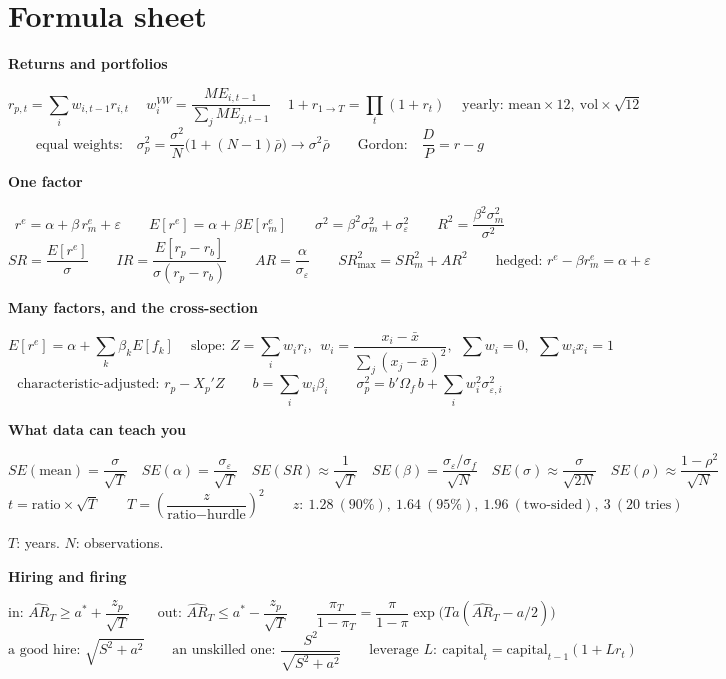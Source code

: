 \documentclass[11pt]{article}
\newcounter{ex}[section]
\newcommand{\head}[1]{\par\medskip\textbf{#1}\par}
\newcommand{\re}{r^{e}}
\newcommand{\SR}{\mathit{SR}}
\newcommand{\AR}{\mathit{AR}}
\newcommand{\IR}{\mathit{IR}}
\begin{document}
\section*{Formula sheet}\label{sec:sheet}
{\small
\head{Returns and portfolios}
\[ r_{p,t} = \sum_{i} w_{i,t-1}r_{i,t} \quad\ w^{VW}_{i} = \frac{ME_{i,t-1}}{\sum_{j}ME_{j,t-1}} \quad\
   1 + r_{1\to T} = \prod_{t}(1+r_{t}) \quad\ \text{yearly: mean}\times 12,\ \text{vol}\times\sqrt{12} \]
\[ \text{equal weights:}\quad \sigma_{p}^{2} = \frac{\sigma^{2}}{N}\big(1 + (N-1)\bar\rho\big) \to \sigma^{2}\bar\rho
   \qquad \text{Gordon:}\quad \frac{D}{P} = r - g \]

\head{One factor}
\[ \re = \alpha + \beta\,\re_{m} + \varepsilon \qquad E[\re] = \alpha + \beta E[\re_{m}] \qquad
   \sigma^{2} = \beta^{2}\sigma_{m}^{2} + \sigma_{\varepsilon}^{2} \qquad R^{2} = \frac{\beta^{2}\sigma_{m}^{2}}{\sigma^{2}} \]
\[ \SR = \frac{E[\re]}{\sigma} \qquad \IR = \frac{E[r_{p} - r_{b}]}{\sigma(r_{p} - r_{b})} \qquad \AR = \frac{\alpha}{\sigma_{\varepsilon}}
   \qquad \SR_{\max}^{2} = \SR_{m}^{2} + \AR^{2} \qquad \text{hedged: } \re - \beta\re_{m} = \alpha + \varepsilon \]

\head{Many factors, and the cross-section}
\[ E[\re] = \alpha + \sum_{k}\beta_{k}E[f_{k}] \quad\
   \text{slope: } Z = \sum_{i}w_{i}r_{i},\ \ w_{i} = \frac{x_{i} - \bar x}{\sum_{j}(x_{j} - \bar x)^{2}},\ \
   \sum w_{i} = 0,\ \ \sum w_{i}x_{i} = 1 \]
\[ \text{characteristic-adjusted: } r_{p} - X_{p}'Z \qquad
   b = \sum_{i}w_{i}\beta_{i} \qquad \sigma_{p}^{2} = b'\Omega_{f}\,b + \sum_{i}w_{i}^{2}\sigma_{\varepsilon,i}^{2} \]

\head{What data can teach you}
\[ SE(\text{mean}) = \frac{\sigma}{\sqrt{T}} \quad SE(\alpha) = \frac{\sigma_{\varepsilon}}{\sqrt{T}} \quad
   SE(\SR) \approx \frac{1}{\sqrt{T}} \quad SE(\beta) = \frac{\sigma_{\varepsilon}/\sigma_{f}}{\sqrt{N}} \quad
   SE(\sigma) \approx \frac{\sigma}{\sqrt{2N}} \quad SE(\rho) \approx \frac{1 - \rho^{2}}{\sqrt{N}} \]
\[ t = \text{ratio}\times\sqrt{T} \qquad T = \left(\frac{z}{\text{ratio} - \text{hurdle}}\right)^{2}
   \qquad z:\ 1.28\ (90\%),\ 1.64\ (95\%),\ 1.96\ (\text{two-sided}),\ 3\ (20 \text{ tries}) \]
{\centering $T$: years. $N$: observations.\par}

\head{Hiring and firing}
\[ \text{in: } \widehat{\AR}_{T} \ge a^{*} + \frac{z_{p}}{\sqrt{T}} \qquad \text{out: } \widehat{\AR}_{T} \le a^{*} - \frac{z_{p}}{\sqrt{T}}
   \qquad \frac{\pi_{T}}{1 - \pi_{T}} = \frac{\pi}{1 - \pi}\exp\!\big(T a(\widehat{\AR}_{T} - a/2)\big) \]
\[ \text{a good hire: } \sqrt{S^{2} + a^{2}} \qquad \text{an unskilled one: } \frac{S^{2}}{\sqrt{S^{2} + a^{2}}}
   \qquad \text{leverage } L:\ \text{capital}_{t} = \text{capital}_{t-1}(1 + L r_{t}) \]

}
\end{document}

